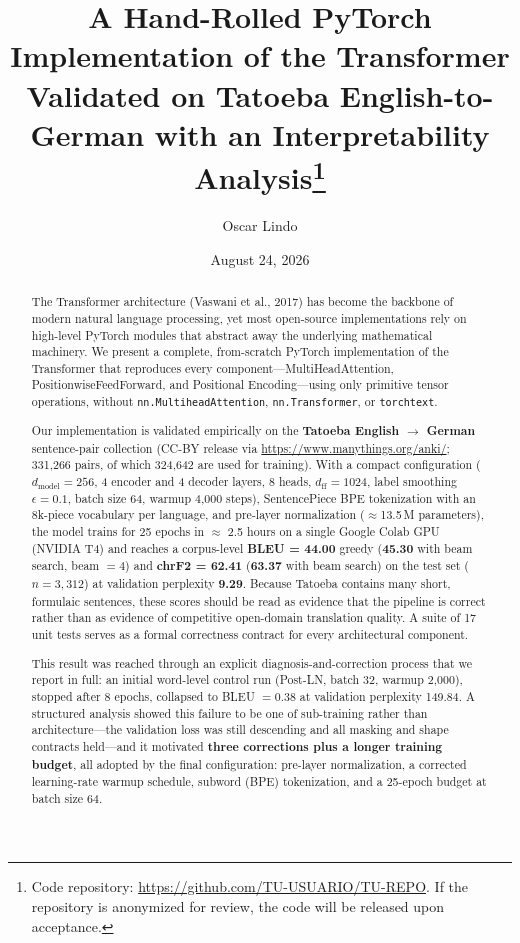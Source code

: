 \documentclass[10pt]{article}
\title{\vspace{-1.0cm}\textbf{A Hand-Rolled PyTorch Implementation of the Transformer \\[0.2em]
\large Validated on Tatoeba English-to-German with an Interpretability Analysis}\footnote{Code repository: \url{https://github.com/TU-USUARIO/TU-REPO}. If the repository is anonymized for review, the code will be released upon acceptance.}}
\author{Oscar Lindo}
\date{August 24, 2026}
\begin{document}
\maketitle
\thispagestyle{empty}

\begin{abstract}
The Transformer architecture (Vaswani et al., 2017) has become the backbone of modern natural language processing, yet most open-source implementations rely on high-level PyTorch modules that abstract away the underlying mathematical machinery. We present a complete, from-scratch PyTorch implementation of the Transformer that reproduces every component---MultiHeadAttention, PositionwiseFeedForward, and Positional Encoding---using only primitive tensor operations, without \texttt{nn.MultiheadAttention}, \texttt{nn.Transformer}, or \texttt{torchtext}.

Our implementation is validated empirically on the \textbf{Tatoeba English $\rightarrow$ German} sentence-pair collection (CC-BY release via \url{https://www.manythings.org/anki/}; 331{,}266 pairs, of which 324{,}642 are used for training). With a compact configuration ($d_{\text{model}} = 256$, 4 encoder and 4 decoder layers, 8 heads, $d_{\text{ff}} = 1024$, label smoothing $\epsilon = 0.1$, batch size 64, warmup 4{,}000 steps), SentencePiece BPE tokenization with an 8k-piece vocabulary per language, and pre-layer normalization ($\approx$13.5\,M parameters), the model trains for 25 epochs in $\approx$ 2.5 hours on a single Google Colab GPU (NVIDIA T4) and reaches a corpus-level \textbf{BLEU = 44.00} greedy (\textbf{45.30} with beam search, beam $=4$) and \textbf{chrF2 = 62.41} (\textbf{63.37} with beam search) on the test set ($n = 3{,}312$) at validation perplexity \textbf{9.29}. Because Tatoeba contains many short, formulaic sentences, these scores should be read as evidence that the pipeline is correct rather than as evidence of competitive open-domain translation quality. A suite of 17 unit tests serves as a formal correctness contract for every architectural component.

This result was reached through an explicit diagnosis-and-correction process that we report in full: an initial word-level control run (Post-LN, batch 32, warmup 2{,}000), stopped after 8 epochs, collapsed to BLEU $= 0.38$ at validation perplexity 149.84. A structured analysis showed this failure to be one of sub-training rather than architecture---the validation loss was still descending and all masking and shape contracts held---and it motivated \textbf{three corrections plus a longer training budget}, all adopted by the final configuration: pre-layer normalization, a corrected learning-rate warmup schedule, subword (BPE) tokenization, and a 25-epoch budget at batch size 64.


\end{abstract}
\end{document}
